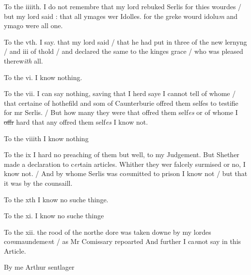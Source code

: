 \documentclass[12pt, a4paper]{book}
\begin{document}
		\ifthenelse{\isodd{\thepage}}
		{\reversemarginpar}
		{\normalmarginpar}
		To the iiiith. I do not remembre that my lord rebuked
Serlis for thies wourdes / but 
			my lord said : that all
ymages wer Idolles. for the greke wourd idolu\textit{m} and
ymago were all one.
            		
		\ifthenelse{\isodd{\thepage}}
		{\reversemarginpar}
		{\normalmarginpar}
		To the vth. I say. that my lord said / that he had
put in three of the new lernyng / and iii of thold / and
declared the same to the kinges grace / who was pleased
therew\textit{ith} all.
            		
		\ifthenelse{\isodd{\thepage}}
		{\reversemarginpar}
		{\normalmarginpar}
		To the vi. I know nothing. 
            		
		\ifthenelse{\isodd{\thepage}}
		{\reversemarginpar}
		{\normalmarginpar}
		To the vii. I can say nothing, saving that I herd saye
I cannot tell of whome / that certaine of hothefild
and som of Caunterburie offred them selfes to testifie
for mr Serlis. / But how many they were that
offred them self\textit{es} or of whome I \sout{offr }hard that any 
offred them self\textit{es} I know not. 
            		
		\ifthenelse{\isodd{\thepage}}
		{\reversemarginpar}
		{\normalmarginpar}
		To the viiith I know nothing
            		
		\ifthenelse{\isodd{\thepage}}
		{\reversemarginpar}
		{\normalmarginpar}
		To the ix I hard no preaching of them but well, to my
Judgement. But Shether made a declaration to c\textit{er}tain
articles. Whither they wer falcely surmised or no, I 
know not. / And by whome Serlis was co\textit{m}mitted to prison
I know not / but that it was by the counsaill.
            		
		\ifthenelse{\isodd{\thepage}}
		{\reversemarginpar}
		{\normalmarginpar}
		To the xth I know no suche thinge. 
            		
		\ifthenelse{\isodd{\thepage}}
		{\reversemarginpar}
		{\normalmarginpar}
		To the xi. I know no suche thinge
            		
		\ifthenelse{\isodd{\thepage}}
		{\reversemarginpar}
		{\normalmarginpar}
		To the xii. the rood of the northe dore was taken downe
by my lordes co\textit{m}maundeme\textit{n}t / as Mr Comissary repoarted
And further I ca\textit{n}not say in this Article. 


		\ifthenelse{\isodd{\thepage}}
		{\reversemarginpar}
		{\normalmarginpar}
		By me Arthur sentlager
\end{document}
